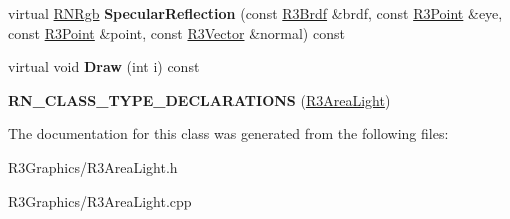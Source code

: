 \begin{DoxyCompactItemize}
\item 
virtual \hyperlink{class_r_n_rgb}{R\+N\+Rgb} {\bfseries Specular\+Reflection} (const \hyperlink{class_r3_brdf}{R3\+Brdf} \&brdf, const \hyperlink{class_r3_point}{R3\+Point} \&eye, const \hyperlink{class_r3_point}{R3\+Point} \&point, const \hyperlink{class_r3_vector}{R3\+Vector} \&normal) const \hypertarget{class_r3_area_light_a506eae3d2a4270b1b25f5b92578b5636}{}\label{class_r3_area_light_a506eae3d2a4270b1b25f5b92578b5636}

\item 
virtual void {\bfseries Draw} (int i) const \hypertarget{class_r3_area_light_ab900beffb664cfa6b3b4ae300b0389b5}{}\label{class_r3_area_light_ab900beffb664cfa6b3b4ae300b0389b5}

\item 
{\bfseries R\+N\+\_\+\+C\+L\+A\+S\+S\+\_\+\+T\+Y\+P\+E\+\_\+\+D\+E\+C\+L\+A\+R\+A\+T\+I\+O\+NS} (\hyperlink{class_r3_area_light}{R3\+Area\+Light})\hypertarget{class_r3_area_light_a8cb9498bd5bf548faf072b213f7addbe}{}\label{class_r3_area_light_a8cb9498bd5bf548faf072b213f7addbe}

\end{DoxyCompactItemize}


The documentation for this class was generated from the following files\+:\begin{DoxyCompactItemize}
\item 
R3\+Graphics/R3\+Area\+Light.\+h\item 
R3\+Graphics/R3\+Area\+Light.\+cpp\end{DoxyCompactItemize}
